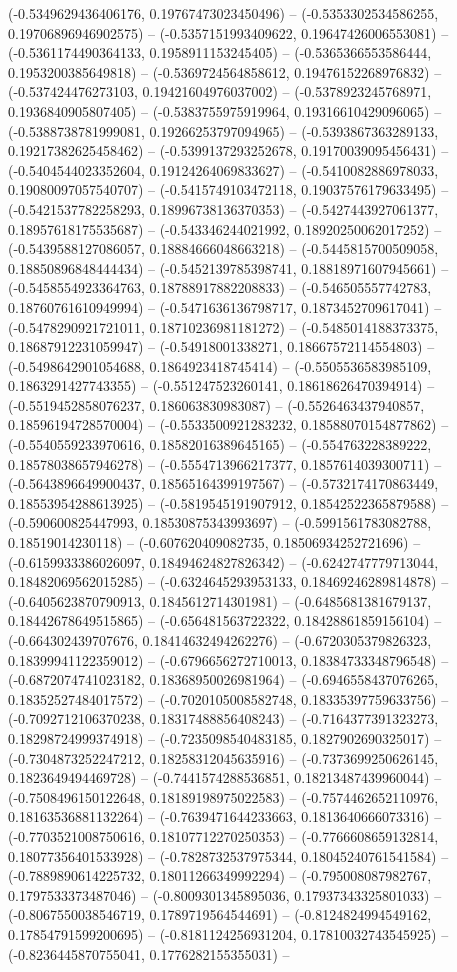 (-0.5349629436406176, 0.19767473023450496) -- (-0.5353302534586255, 0.19706896946902575) -- (-0.5357151993409622, 0.19647426006553081) -- (-0.5361174490364133, 0.1958911153245405) -- (-0.5365366553586444, 0.1953200385649818) -- (-0.5369724564858612, 0.19476152268976832) -- (-0.537424476273103, 0.19421604976037002) -- (-0.5378923245768971, 0.1936840905807405) -- (-0.5383755975919964, 0.19316610429096065) -- (-0.5388738781999081, 0.19266253797094965) -- (-0.5393867363289133, 0.19217382625458462) -- (-0.5399137293252678, 0.19170039095456431) -- (-0.5404544023352604, 0.19124264069833627) -- (-0.5410082886978033, 0.19080097057540707) -- (-0.5415749103472118, 0.19037576179633495) -- (-0.5421537782258293, 0.18996738136370353) -- (-0.5427443927061377, 0.18957618175535687) -- (-0.543346244021992, 0.18920250062017252) -- (-0.5439588127086057, 0.18884666048663218) -- (-0.5445815700509058, 0.18850896848444434) -- (-0.5452139785398741, 0.18818971607945661) -- (-0.5458554923364763, 0.18788917882208833) -- (-0.546505557742783, 0.18760761610949994) -- (-0.5471636136798717, 0.1873452709617041) -- (-0.5478290921721011, 0.18710236981181272) -- (-0.5485014188373375, 0.18687912231059947) -- (-0.54918001338271, 0.18667572114554803) -- (-0.5498642901054688, 0.1864923418745414) -- (-0.5505536583985109, 0.1863291427743355) -- (-0.551247523260141, 0.18618626470394914) -- (-0.5519452858076237, 0.186063830983087) -- (-0.5526463437940857, 0.18596194728570004) -- (-0.5533500921283232, 0.18588070154877862) -- (-0.5540559233970616, 0.18582016389645165) -- (-0.554763228389222, 0.18578038657946278) -- (-0.5554713966217377, 0.1857614039300711) -- (-0.5643896649900437, 0.18565164399197567) -- (-0.5732174170863449, 0.18553954288613925) -- (-0.5819545191907912, 0.18542522365879588) -- (-0.590600825447993, 0.18530875343993697) -- (-0.5991561783082788, 0.18519014230118) -- (-0.607620409082735, 0.18506934252721696) -- (-0.6159933386026097, 0.18494624827826342) -- (-0.6242747779713044, 0.18482069562015285) -- (-0.6324645293953133, 0.18469246289814878) -- (-0.6405623870790913, 0.1845612714301981) -- (-0.6485681381679137, 0.18442678649515865) -- (-0.656481563722322, 0.18428861859156104) -- (-0.664302439707676, 0.18414632494262276) -- (-0.6720305379826323, 0.18399941122359012) -- (-0.6796656272710013, 0.18384733348796548) -- (-0.6872074741023182, 0.18368950026981964) -- (-0.6946558437076265, 0.18352527484017572) -- (-0.7020105008582748, 0.18335397759633756) -- (-0.7092712106370238, 0.18317488856408243) -- (-0.7164377391323273, 0.18298724999374918) -- (-0.7235098540483185, 0.1827902690325017) -- (-0.7304873252247212, 0.18258312045635916) -- (-0.7373699250626145, 0.1823649494469728) -- (-0.7441574288536851, 0.18213487439960044) -- (-0.7508496150122648, 0.18189198975022583) -- (-0.7574462652110976, 0.18163536881132264) -- (-0.7639471644233663, 0.1813640666073316) -- (-0.7703521008750616, 0.18107712270250353) -- (-0.7766608659132814, 0.18077356401533928) -- (-0.7828732537975344, 0.18045240761541584) -- (-0.7889890614225732, 0.18011266349992294) -- (-0.795008087982767, 0.1797533373487046) -- (-0.8009301345895036, 0.17937343325801033) -- (-0.8067550038546719, 0.1789719564544691) -- (-0.8124824994549162, 0.17854791599200695) -- (-0.8181124256931204, 0.17810032743545925) -- (-0.8236445870755041, 0.1776282155355031) -- 